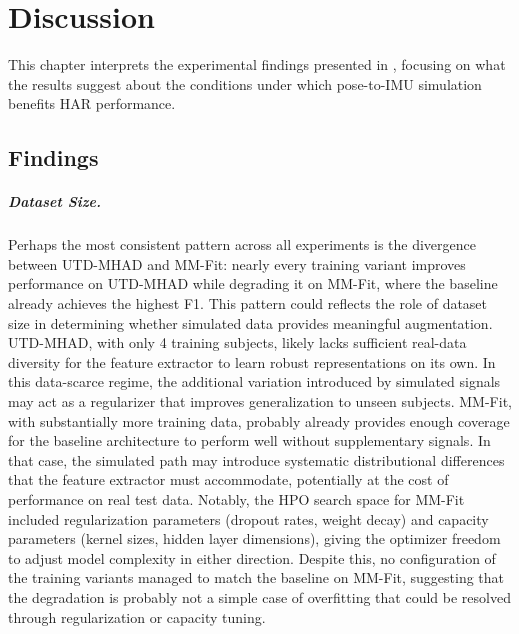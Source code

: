 \chapter{Discussion}
\label{chap:discussion}
{\renewcommand{\thefootnote}{}}

This chapter interprets the experimental findings presented in , focusing on what the results suggest about the conditions under which pose-to-IMU simulation\cite{kwon2020imutube} benefits HAR performance.

\section{Findings}

\paragraph{Dataset Size.}
Perhaps the most consistent pattern across all experiments is the divergence between UTD-MHAD\cite{chen2015utd} and MM-Fit\cite{stromback2020mm}: nearly every training variant improves performance on UTD-MHAD while degrading it on MM-Fit, where the baseline already achieves the highest F1. This pattern could reflects the role of dataset size in determining whether simulated data provides meaningful augmentation. UTD-MHAD, with only 4 training subjects, likely lacks sufficient real-data diversity for the feature extractor to learn robust representations on its own. In this data-scarce regime, the additional variation introduced by simulated signals may act as a regularizer that improves generalization to unseen subjects. MM-Fit, with substantially more training data, probably already provides enough coverage for the baseline architecture to perform well without supplementary signals. In that case, the simulated path may introduce systematic distributional differences that the feature extractor must accommodate, potentially at the cost of performance on real test data. Notably, the HPO search space for MM-Fit included regularization parameters (dropout rates, weight decay) and capacity parameters (kernel sizes, hidden layer dimensions), giving the optimizer freedom to adjust model complexity in either direction. Despite this, no configuration of the training variants managed to match the baseline on MM-Fit, suggesting that the degradation is probably not a simple case of overfitting that could be resolved through regularization or capacity tuning.

